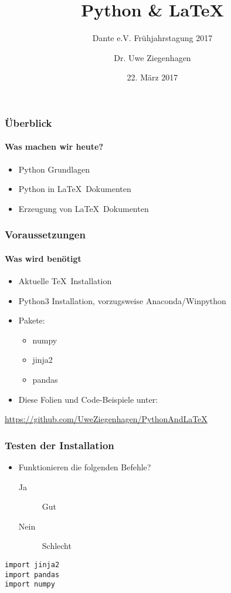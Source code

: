 \documentclass[12pt,ngerman]{beamer}
\author{Dr. Uwe Ziegenhagen}
\title{Python \& \LaTeX}
\subtitle{Dante e.V. Frühjahrstagung 2017}
\date{22. März 2017}
\begin{document}
\begin{frame}

\maketitle

\end{frame}


\begin{frame}
\frametitle{Überblick}
\framesubtitle{Was machen wir heute?}

\begin{itemize}
\item Python Grundlagen
\item Python in \LaTeX\ Dokumenten
\item Erzeugung von \LaTeX\ Dokumenten
\end{itemize}
\end{frame}


\begin{frame}
\frametitle{Voraussetzungen}
\framesubtitle{Was wird benötigt}

\begin{itemize}
\item Aktuelle \TeX\ Installation
\item Python3 Installation, vorzugsweise Anaconda/Winpython
\item Pakete:
\begin{itemize}
	\item numpy
	\item jinja2
	\item pandas
\end{itemize}
\item Diese Folien und Code-Beispiele unter: 
\end{itemize}

\url{https://github.com/UweZiegenhagen/PythonAndLaTeX}

\end{frame}

\begin{frame}[containsverbatim]
\frametitle{Testen der Installation}

\begin{itemize}
	\item Funktionieren die folgenden Befehle?
\begin{description}
		\item[Ja] Gut
		\item[Nein] Schlecht
	\end{description}
\end{itemize}

\begin{lstlisting}
import jinja2
import pandas
import numpy
\end{lstlisting}
\end{frame}
\end{document}
